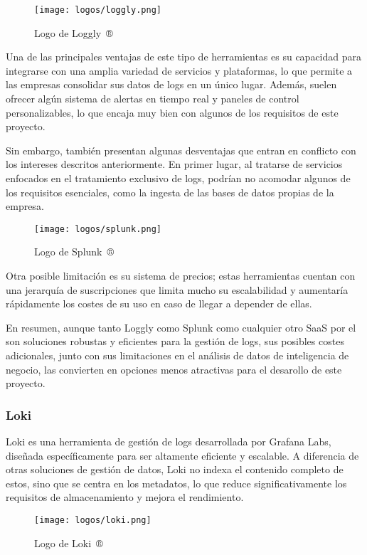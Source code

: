 \begin{figure}[H]
	\centering
	\texttt{[image: logos/loggly.png]}
	\caption{Logo de Loggly~®}
\end{figure}

Una de las principales ventajas de este tipo de herramientas es su capacidad
para integrarse con una amplia variedad de servicios y plataformas, lo que
permite a las empresas consolidar sus datos de logs en un único lugar. Además,
suelen ofrecer algún sistema de alertas en tiempo real y paneles de control
personalizables, lo que encaja muy bien con algunos de los requisitos de este
proyecto.

Sin embargo, también presentan algunas desventajas que entran en conflicto con
los intereses descritos anteriormente. En primer lugar, al tratarse de
servicios enfocados en el tratamiento exclusivo de logs, podrían no acomodar
algunos de los requisitos esenciales, como la ingesta de las bases de datos
propias de la empresa.

\begin{figure}[H]
	\centering
	\texttt{[image: logos/splunk.png]}
	\caption{Logo de Splunk~®}
\end{figure}

Otra posible limitación es su sistema de precios; estas herramientas cuentan con
una jerarquía de suscripciones que limita mucho su escalabilidad y aumentaría
rápidamente los costes de su uso en caso de llegar a depender de ellas.

En resumen, aunque tanto Loggly como Splunk como cualquier otro SaaS por el
son soluciones robustas y eficientes para la gestión de logs, sus posibles
costes adicionales, junto con sus limitaciones en el análisis de datos de
inteligencia de negocio, las convierten en opciones menos atractivas para el
desarollo de este proyecto.

\subsubsection{Loki}
Loki es una herramienta de gestión de logs desarrollada por Grafana Labs,
diseñada específicamente para ser altamente eficiente y escalable. A diferencia
de otras soluciones de gestión de datos, Loki no indexa el contenido completo de
estos, sino que se centra en los metadatos, lo que reduce significativamente
los requisitos de almacenamiento y mejora el rendimiento.

\begin{figure}[H]
	\centering
	\texttt{[image: logos/loki.png]}
	\caption{Logo de Loki~®}
\end{figure}

